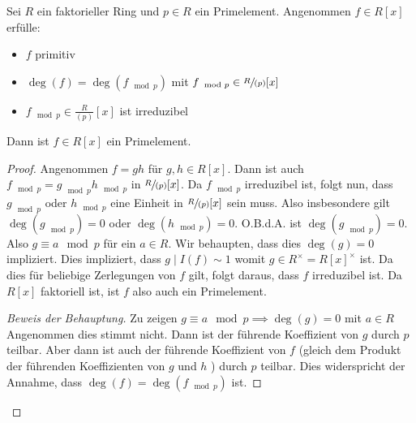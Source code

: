 \begin{proposition}
	Sei $R$ ein faktorieller Ring und $p \in R$ ein Primelement.
	Angenommen $f \in R[x]$ erfülle:
	\begin{itemize}
		\item $f$ primitiv
		\item $\deg(f) = \deg(f_{\mod p})$ mit $f_{\mod p} \in \sfrac{R}{(p)}[x]$
		\item $f_{\mod p} \in \frac{R}{(p)} [x]$ ist irreduzibel
	\end{itemize}
	Dann ist $f \in R[x]$ ein Primelement.
\end{proposition}

\begin{proof}
	Angenommen $f = gh$ für $g,h \in R[x]$.
	Dann ist auch $f_{\mod p} = g_{\mod p} h_{\mod p}$ in $\sfrac{R}{(p)}[x]$.
	Da $f_{\mod p}$ irreduzibel ist, folgt nun, dass $g_{\mod p}$ oder $h_{\mod p}$ eine Einheit in $\sfrac{R}{(p)}[x]$ sein muss.
	Also insbesondere gilt $\deg(g_{\mod p}) = 0$ oder $\deg(h_{\mod p}) = 0$.
	O.B.d.A. ist $\deg(g_{\mod p}) = 0$. Also $g \equiv a \mod p$ für ein $a \in R$.
	Wir behaupten, dass dies $\deg(g)= 0$ impliziert.
	Dies impliziert, dass $g \mid I(f) \sim 1$ womit $g \in R^{\times} = R[x]^{\times}$ ist.
	Da dies für beliebige Zerlegungen von $f$ gilt, folgt daraus, dass $f$ irreduzibel ist.
	Da  $R[x]$ faktoriell ist, ist $f$ also auch ein Primelement.

	\begin{proof}[Beweis der Behauptung]
		Zu zeigen $g \equiv a \mod p \implies \deg(g) = 0$ mit $a \in R$ \\
		Angenommen dies stimmt nicht. Dann ist der führende Koeffizient von $g$ durch $p$ teilbar.
		Aber dann ist auch der führende Koeffizient von $f$ (gleich dem Produkt der führenden Koeffizienten von $g$ und $h$ )
		durch $p$ teilbar. Dies widerspricht der Annahme, dass $\deg(f) = \deg(f_{\mod p})$ ist.
	\end{proof}
\end{proof}

